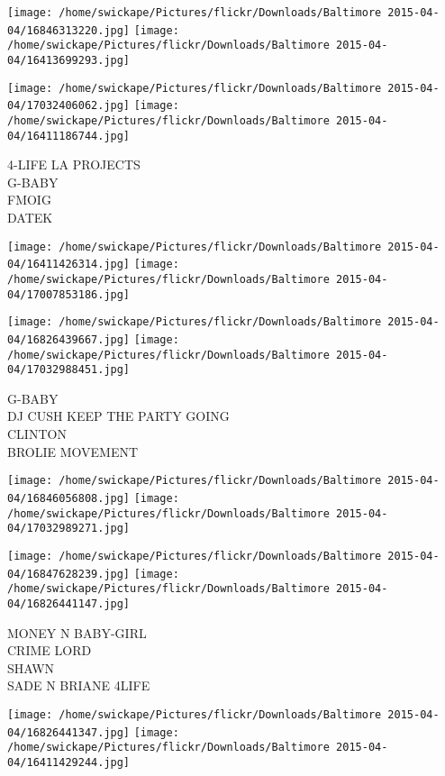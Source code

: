 \documentclass[10pt,letterpaper]{article}
\begin{document}
\texttt{[image: /home/swickape/Pictures/flickr/Downloads/Baltimore 2015-04-04/16846313220.jpg]}
\texttt{[image: /home/swickape/Pictures/flickr/Downloads/Baltimore 2015-04-04/16413699293.jpg]}

\texttt{[image: /home/swickape/Pictures/flickr/Downloads/Baltimore 2015-04-04/17032406062.jpg]}
\texttt{[image: /home/swickape/Pictures/flickr/Downloads/Baltimore 2015-04-04/16411186744.jpg]}

4{-}LIFE LA PROJECTS\\
G{-}BABY\\
FMOIG\\
DATEK\\
\pagebreak

\texttt{[image: /home/swickape/Pictures/flickr/Downloads/Baltimore 2015-04-04/16411426314.jpg]}
\texttt{[image: /home/swickape/Pictures/flickr/Downloads/Baltimore 2015-04-04/17007853186.jpg]}

\texttt{[image: /home/swickape/Pictures/flickr/Downloads/Baltimore 2015-04-04/16826439667.jpg]}
\texttt{[image: /home/swickape/Pictures/flickr/Downloads/Baltimore 2015-04-04/17032988451.jpg]}

G{-}BABY\\
DJ CUSH KEEP THE PARTY GOING\\
CLINTON\\
BROLIE MOVEMENT\\
\pagebreak

\texttt{[image: /home/swickape/Pictures/flickr/Downloads/Baltimore 2015-04-04/16846056808.jpg]}
\texttt{[image: /home/swickape/Pictures/flickr/Downloads/Baltimore 2015-04-04/17032989271.jpg]}

\texttt{[image: /home/swickape/Pictures/flickr/Downloads/Baltimore 2015-04-04/16847628239.jpg]}
\texttt{[image: /home/swickape/Pictures/flickr/Downloads/Baltimore 2015-04-04/16826441147.jpg]}

MONEY N BABY{-}GIRL\\
CRIME LORD\\
SHAWN\\
SADE N BRIANE 4LIFE\\
\pagebreak

\texttt{[image: /home/swickape/Pictures/flickr/Downloads/Baltimore 2015-04-04/16826441347.jpg]}
\texttt{[image: /home/swickape/Pictures/flickr/Downloads/Baltimore 2015-04-04/16411429244.jpg]}
\end{document}
